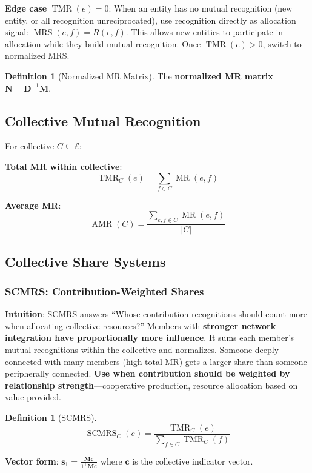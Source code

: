 \documentclass[11pt,a4paper]{article}
\theoremstyle{definition}
\newtheorem{definition}[theorem]{Definition}
\theoremstyle{remark}
\newcommand{\E}{\mathcal{E}}
\DeclareMathOperator{\TMR}{TMR}
\DeclareMathOperator{\MR}{MR}
\DeclareMathOperator{\MRS}{MRS}
\DeclareMathOperator{\SCMRS}{SCMRS}
\DeclareMathOperator{\AMR}{AMR}
\begin{document}
\textbf{Edge case} $\TMR(e) = 0$: When an entity has no mutual recognition (new entity, or all recognition unreciprocated), use recognition directly as allocation signal: $\MRS(e,f) = R(e,f)$. This allows new entities to participate in allocation while they build mutual recognition. Once $\TMR(e) > 0$, switch to normalized MRS.

\begin{definition}[Normalized MR Matrix]
The \textbf{normalized MR matrix} $\mathbf{N} = \mathbf{D}^{-1}\mathbf{M}$.
\end{definition}

\subsection{Collective Mutual Recognition}

For collective $C \subseteq \E$:

\textbf{Total MR within collective}:
\[ \TMR_C(e) = \sum_{f \in C} \MR(e,f) \]

\textbf{Average MR}:
\[ \AMR(C) = \frac{\sum_{e,f \in C} \MR(e,f)}{|C|} \]

\subsection{Collective Share Systems}

\subsubsection{SCMRS: Contribution-Weighted Shares}

\textbf{Intuition}: SCMRS answers ``Whose contribution-recognitions should count more when allocating collective resources?'' Members with \textbf{stronger network integration have proportionally more influence}. It sums each member's mutual recognitions within the collective and normalizes. Someone deeply connected with many members (high total MR) gets a larger share than someone peripherally connected. \textbf{Use when contribution should be weighted by relationship strength}---cooperative production, resource allocation based on value provided.

\begin{definition}[SCMRS]
\[ \SCMRS_C(e) = \frac{\TMR_C(e)}{\sum_{f \in C} \TMR_C(f)} \]
\end{definition}

\textbf{Vector form}: $\mathbf{s}_1 = \frac{\mathbf{M}\mathbf{c}}{\mathbf{1}^\top \mathbf{M}\mathbf{c}}$ where $\mathbf{c}$ is the collective indicator vector.
\end{document}
